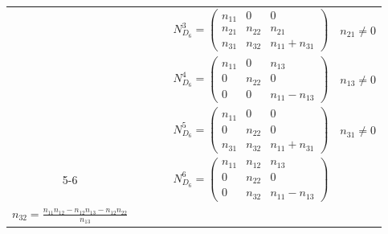 \documentclass[12pt, reqno]{amsart}
\theoremstyle{plain}
\begin{document}
\begin{table}[H]
\begin{tabular}{|c|c|l|c|l|l|}
    & & & & $N_{D_6}^3 = \begin{pmatrix} n_{11} & 0 & 0 \\ n_{21} & n_{22} & n_{21} \\ n_{31} & n_{32} & n_{11}+n_{31} \end{pmatrix}$ & $n_{21} \neq 0$ \\
    & & & & $N_{D_6}^4 = \begin{pmatrix} n_{11} & 0 & n_{13} \\ 0 & n_{22} & 0 \\ 0 & 0 & n_{11}-n_{13} \end{pmatrix}$ & $n_{13} \neq 0$ \\
    & & & & $N_{D_6}^5 = \begin{pmatrix} n_{11} & 0 & 0 \\ 0 & n_{22} & 0 \\ n_{31} & n_{32} & n_{11}+n_{31} \end{pmatrix}$ & $n_{31} \neq 0$ \\
    \cline{5-6}
    & & & & $N_{D_6}^6 = \begin{pmatrix} n_{11} & n_{12} & n_{13} \\ 0 & n_{22} & 0 \\ 0 & n_{32}& n_{11}-n_{13} \end{pmatrix}$ & \makecell[l]{
    $n_{12} \neq 0,\ n_{13} \neq 0,$ \\
    $n_{32}=\frac{n_{11}n_{12}-n_{12}n_{13}-n_{12}n_{22}}{n_{13}}$}
    \\
    \hline
    \end{tabular}
    \label{tab:nijenhuis_3d_associative_D1-D6}
\end{table}
\end{document}
